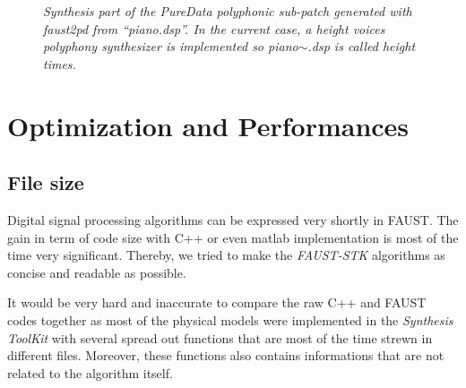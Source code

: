\documentclass[twoside,a4paper]{article}
\begin{document}
\begin{figure}[ht]
\begin{center}
\caption{{\it Synthesis part of the PureData polyphonic sub-patch
    generated with faust2pd from ``piano.dsp''. In the current case, a
  height voices polyphony synthesizer is implemented so
  piano$\sim$.dsp is called height times.}}
\label{fig:pianoPatch}
\end{center}
\end{figure}

\section{Optimization and Performances}

\subsection{File size}

Digital signal processing algorithms can be expressed very shortly in
FAUST. The gain in term of code size with C++ or even matlab
implementation is most of the time very significant. Thereby, we tried
to make the {\it FAUST-STK} algorithms as concise and readable as
possible.

It would be very hard and inaccurate to compare the raw C++ and
FAUST codes together as most of the physical models were implemented
in the {\it Synthesis ToolKit} with several spread out functions that
are most of the time strewn in different files. Moreover, these
functions also contains informations that are not related to the
algorithm itself.
\end{document}
